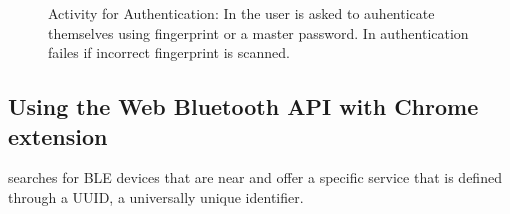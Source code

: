 \begin{figure}[H]
\centering
{}
\qquad
{}
\caption[Activity for Authentication]{Activity for Authentication: In \protect{} the user is asked to auhenticate themselves using fingerprint or a master password. In \protect{} authentication failes if incorrect fingerprint is scanned.}
\label{fig:authentication}
\end{figure}


\subsection{Using the Web Bluetooth API with Chrome extension}
 searches for BLE devices that are near and offer a specific service that is defined through a UUID, a universally unique identifier. 
 
 

